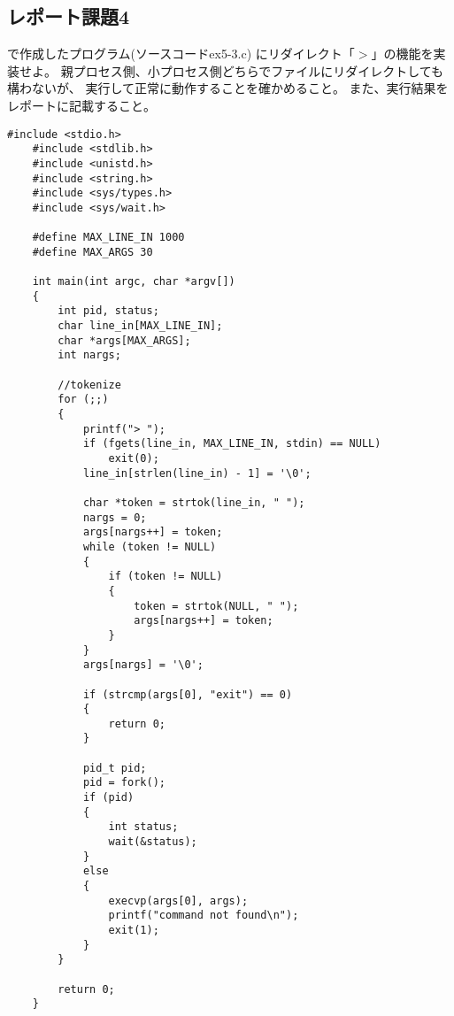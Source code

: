 \documentclass[12pt]{jarticle}
\begin{document}
\subsection{レポート課題4}
\begin{shadebox}
    で作成したプログラム(ソースコードex5-3.c)
    にリダイレクト「$>$」の機能を実装せよ。
    親プロセス側、小プロセス側どちらでファイルにリダイレクトしても構わないが、
    実行して正常に動作することを確かめること。
    また、実行結果をレポートに記載すること。
\end{shadebox}
\begin{lstlisting}[caption=ex5-3.c,label=ex5-3, style=lstC]
    #include <stdio.h>
    #include <stdlib.h>
    #include <unistd.h>
    #include <string.h>
    #include <sys/types.h>
    #include <sys/wait.h>
    
    #define MAX_LINE_IN 1000
    #define MAX_ARGS 30
    
    int main(int argc, char *argv[])
    {
        int pid, status;
        char line_in[MAX_LINE_IN];
        char *args[MAX_ARGS];
        int nargs;
    
        //tokenize
        for (;;)
        {
            printf("> ");
            if (fgets(line_in, MAX_LINE_IN, stdin) == NULL)
                exit(0);
            line_in[strlen(line_in) - 1] = '\0';
    
            char *token = strtok(line_in, " ");
            nargs = 0;
            args[nargs++] = token;
            while (token != NULL)
            {
                if (token != NULL)
                {
                    token = strtok(NULL, " ");
                    args[nargs++] = token;
                }
            }
            args[nargs] = '\0';
    
            if (strcmp(args[0], "exit") == 0)
            {
                return 0;
            }
    
            pid_t pid;
            pid = fork();
            if (pid)
            {
                int status;
                wait(&status);
            }
            else
            {
                execvp(args[0], args);
                printf("command not found\n");
                exit(1);
            }
        }
    
        return 0;
    }
\end{lstlisting}
\end{document}
